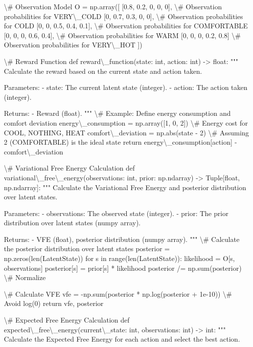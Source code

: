 \documentclass[11pt,a4paper]{article}
\begin{document}
\textbackslash{}# Observation Model
O = np.array([
    [0.8, 0.2, 0, 0, 0],    \textbackslash{}# Observation probabilities for VERY\textbackslash{}_COLD
    [0, 0.7, 0.3, 0, 0],    \textbackslash{}# Observation probabilities for COLD
    [0, 0, 0.5, 0.4, 0.1],  \textbackslash{}# Observation probabilities for COMFORTABLE
    [0, 0, 0, 0.6, 0.4],    \textbackslash{}# Observation probabilities for WARM
    [0, 0, 0, 0.2, 0.8]     \textbackslash{}# Observation probabilities for VERY\textbackslash{}_HOT
])

\textbackslash{}# Reward Function
def reward\textbackslash{}_function(state: int, action: int) -\textgreater{} float:
    """
    Calculate the reward based on the current state and action taken.
    
    Parameters:
    - state: The current latent state (integer).
    - action: The action taken (integer).
    
    Returns:
    - Reward (float).
    """
    \textbackslash{}# Example: Define energy consumption and comfort deviation
    energy\textbackslash{}_consumption = np.array([1, 0, 2])  \textbackslash{}# Energy cost for COOL, NOTHING, HEAT
    comfort\textbackslash{}_deviation = np.abs(state - 2)  \textbackslash{}# Assuming 2 (COMFORTABLE) is the ideal state
    return energy\textbackslash{}_consumption[action] - comfort\textbackslash{}_deviation

\textbackslash{}# Variational Free Energy Calculation
def variational\textbackslash{}_free\textbackslash{}_energy(observations: int, prior: np.ndarray) -\textgreater{} Tuple[float, np.ndarray]:
    """
    Calculate the Variational Free Energy and posterior distribution over latent states.
    
    Parameters:
    - observations: The observed state (integer).
    - prior: The prior distribution over latent states (numpy array).
    
    Returns:
    - VFE (float), posterior distribution (numpy array).
    """
    \textbackslash{}# Calculate the posterior distribution over latent states
    posterior = np.zeros(len(LatentState))
    for s in range(len(LatentState)):
        likelihood = O[s, observations]
        posterior[s] = prior[s] * likelihood
    posterior /= np.sum(posterior)  \textbackslash{}# Normalize

    \textbackslash{}# Calculate VFE
    vfe = -np.sum(posterior * np.log(posterior + 1e-10))  \textbackslash{}# Avoid log(0)
    return vfe, posterior

\textbackslash{}# Expected Free Energy Calculation
def expected\textbackslash{}_free\textbackslash{}_energy(current\textbackslash{}_state: int, observations: int) -\textgreater{} int:
    """
    Calculate the Expected Free Energy for each action and select the best action.
    
\end{document}
